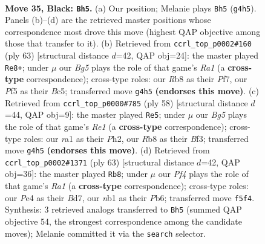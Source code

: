 \documentclass[11pt]{article}
\begin{document}
\clearpage

\begin{figure}[p]\centering
\begin{subfigure}{0.46\textwidth}\centering
\resizebox{\linewidth}{!}{%
\newchessgame
\chessboard[
  setfen={1r2n2k/2p2p1p/p1P5/P4p2/4p1b1/4K1P1/8/RNB5 b - - 1 35},
  showmover=false,
  pgfstyle=straightmove, color=movearrow, markmove={g4-h5}
]}
\caption{}
\end{subfigure}\hfill
\begin{subfigure}{0.46\textwidth}\centering
\resizebox{\linewidth}{!}{%
\newchessgame
\chessboard[
  setfen={r7/5ppp/1pk5/2b4P/3pK1P1/8/1P2PP2/3RB3 b - - 2 32},
  showmover=false,
  pgfstyle=straightmove, color=movearrow, markmove={a8-e8}
]}
\caption{}
\end{subfigure}
\\[4pt]
\begin{subfigure}{0.46\textwidth}\centering
\resizebox{\linewidth}{!}{%
\newchessgame
\chessboard[
  setfen={3r1k2/pp3p1p/8/P5bN/8/2P2BPb/5P1P/4R1K1 w - - 1 30},
  showmover=false,
  pgfstyle=straightmove, color=movearrow, markmove={e1-e5}
]}
\caption{}
\end{subfigure}\hfill
\begin{subfigure}{0.46\textwidth}\centering
\resizebox{\linewidth}{!}{%
\newchessgame
\chessboard[
  setfen={r7/3bk1p1/1p3p2/5P1p/p1NRP3/K7/2P3PP/8 b - - 2 32},
  showmover=false,
  pgfstyle=straightmove, color=movearrow, markmove={a8-b8}
]}
\caption{}
\end{subfigure}
\caption{\textbf{Move 35, Black: \texttt{Bh5}.} (a) Our position; Melanie plays \texttt{Bh5} (\texttt{g4h5}). Panels (b)--(d) are the retrieved master positions whose correspondence most drove this move (highest QAP objective among those that transfer to it). (b) Retrieved from \texttt{ccrl\_top\_p0002\#160} (ply 63) [structural distance $d$=42, QAP obj=24]: the master played \texttt{Re8+}; under $\mu$ our \emph{Bg5} plays the role of that game's \emph{Ra1} (a \textbf{cross-type} correspondence); cross-type roles: our \emph{R}b8 as their \emph{P}f7, our \emph{P}f5 as their \emph{B}c5; transferred move \texttt{g4h5} \textbf{(endorses this move)}. (c) Retrieved from \texttt{ccrl\_top\_p0000\#785} (ply 58) [structural distance $d$=44, QAP obj=9]: the master played \texttt{Re5}; under $\mu$ our \emph{Bg5} plays the role of that game's \emph{Re1} (a \textbf{cross-type} correspondence); cross-type roles: our \emph{r}a1 as their \emph{P}h2, our \emph{R}b8 as their \emph{B}f3; transferred move \texttt{g4h5} \textbf{(endorses this move)}. (d) Retrieved from \texttt{ccrl\_top\_p0002\#1371} (ply 63) [structural distance $d$=42, QAP obj=36]: the master played \texttt{Rb8}; under $\mu$ our \emph{Pf4} plays the role of that game's \emph{Ra1} (a \textbf{cross-type} correspondence); cross-type roles: our \emph{P}e4 as their \emph{B}d7, our \emph{n}b1 as their \emph{P}b6; transferred move \texttt{f5f4}. Synthesis: 3 retrieved analogs transferred to \texttt{Bh5} (summed QAP objective 54, the strongest correspondence among the candidate moves); Melanie committed it via the \texttt{search} selector.}
\label{fig:thought-m69}
\end{figure}
\end{document}

